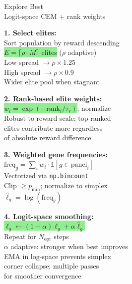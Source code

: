 \documentclass[8pt]{article}
\newlength{\colw}
\begin{document}
\begin{minipage}[t]{\colw}
\begin{tcolorbox}[colback=hdrB, colframe=hdrB, fontupper=\bfseries\footnotesize\color{white},
    arc=2pt, left=2pt, right=2pt, top=1pt, bottom=1pt]
\centering Explore Best\\[-2pt]
{\scriptsize\mdseries Logit-space CEM + rank weights}
\end{tcolorbox}
\vspace{1pt}

\begin{keyboxG}
\textbf{1. Select elites:}\\
Sort population by reward descending\\
\colorbox{lightgreen}{$E = \lceil \rho \cdot M \rceil$ elites} ($\rho$ adaptive)\\
Low spread $\to \rho \times 1.25$\\
High spread $\to \rho \times 0.9$\\
{\scriptsize\color{added} Wider elite pool when stagnant}
\end{keyboxG}\vspace{1pt}

\begin{keyboxG}
\textbf{2. Rank-based elite weights:}\\
\colorbox{lightgreen}{$w_i = \exp(-\text{rank}_i / \tau_r)$}; normalize\\
{\scriptsize\color{added} Robust to reward scale; top-ranked\\
elites contribute more regardless\\
of absolute reward difference}
\end{keyboxG}\vspace{1pt}

\begin{keyboxG}
\textbf{3. Weighted gene frequencies:}\\
$\text{freq}_g = \sum_i w_i \cdot \mathbb{1}[g \in \text{panel}_i]$\\
Vectorized via \texttt{np.bincount}\\
Clip $\geq p_\text{min}$; normalize to simplex\\
$\hat{\ell}_g = \log(\text{freq}_g)$
\end{keyboxG}\vspace{1pt}

\begin{keyboxG}
\textbf{4. Logit-space smoothing:}\\
\colorbox{lightgreen}{$\ell_g \gets (1-\alpha)\ell_g + \alpha\hat{\ell}_g$}\\
Repeat for $N_\text{opt}$ steps\\
$\alpha$ adaptive: stronger when best improves\\
{\scriptsize\color{added} EMA in log-space prevents simplex\\
corner collapse; multiple passes\\
for smoother convergence}
\end{keyboxG}\vspace{1pt}


\end{minipage}
\end{document}
